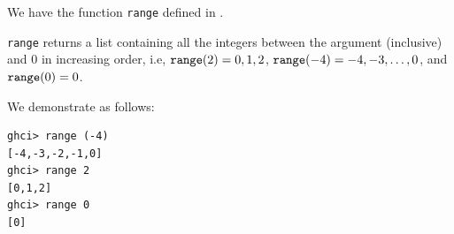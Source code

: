 We have the function \verb|range| defined in .

\verb|range| returns a list containing all the integers between the argument 
(inclusive) and 0 in increasing order, i.e, $\verb|range|(2) = 0, 1, 2$, 
$\verb|range|(-4) = -4, -3, \ldots, 0$, and $\verb|range|(0) = 0$.\par

\qquad We demonstrate as follows:
\begin{lstlisting}
ghci> range (-4)
[-4,-3,-2,-1,0]
ghci> range 2
[0,1,2]
ghci> range 0
[0]
\end{lstlisting}
